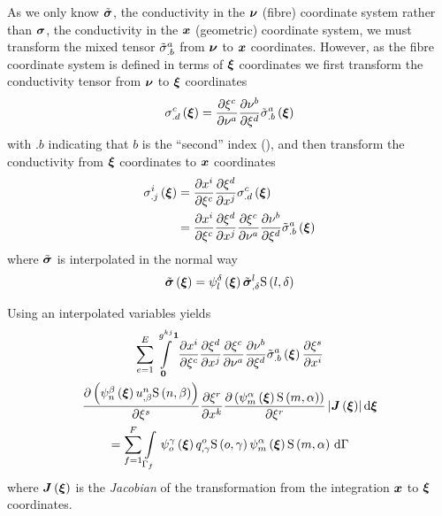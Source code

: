As we only know $\tilde{ \boldsymbol{\mathit{ \sigma }} }$, the conductivity in the 
$ \boldsymbol{\nu} $ (fibre) coordinate system rather than $ \boldsymbol{\mathit{ \sigma }} $, the
conductivity in the $ \boldsymbol{x} $ (geometric) coordinate system, we must transform the mixed
tensor ${\tilde{ \sigma }}^{a}_{.b}$ from $ \boldsymbol{\nu} $ to $ \boldsymbol{x} $ coordinates. However, as the
fibre coordinate system is defined in terms of $ \boldsymbol{\xi} $ coordinates we
first transform the conductivity tensor from $ \boldsymbol{\nu} $ to $ \boldsymbol{\xi} $
coordinates \ie
\begin{equation}
    \sigma ^{c}_{.d}\left(  \boldsymbol{\xi}  \right) = \dfrac{\partial \xi^{c}}{\partial \nu^{a}}  \dfrac{\partial \nu^{b}}{\partial \xi^{d}} 
   {\tilde{ \sigma }}^{a}_{.b}\left(  \boldsymbol{\xi}  \right) 
\end{equation}
with $.b$ indicating that $b$ is the ``second'' index (),
and then transform the conductivity from $ \boldsymbol{\xi} $ coordinates to
$ \boldsymbol{x} $ coordinates \ie
\begin{equation}
  \begin{split}
      \sigma ^{i}_{.j}\left(  \boldsymbol{\xi}  \right)  &=
     \dfrac{\partial x^{i}}{\partial \xi^{c}}  \dfrac{\partial \xi^{d}}{\partial x^{j}} 
     { \sigma }^{c}_{.d}\left(  \boldsymbol{\xi}  \right)  \\
    &=  \dfrac{\partial x^{i}}{\partial \xi^{c}}  \dfrac{\partial \xi^{d}}{\partial x^{j}}  \dfrac{\partial \xi^{c}}{\partial \nu^{a}}  \dfrac{\partial \nu^{b}}{\partial \xi^{d}}  {\tilde{ \sigma }}^{a}_{.b}\left(  \boldsymbol{\xi}  \right) 
  \end{split}
\end{equation}
where $\tilde{ \boldsymbol{\mathit{ \sigma }} }$ is interpolated in the normal way \ie
\begin{equation}
   \tilde{ \boldsymbol{\mathit{ \sigma }} }\left(  \boldsymbol{\xi}  \right) 
  =   \psi_{l}^{\delta} \left(  \boldsymbol{\xi}  \right)    {\tilde{ \boldsymbol{\mathit{ \sigma }} }}^{l} _{,\delta} 
     \mathrm{S} \left( l,\delta \right)  
\end{equation}

Using an interpolated variables yields
\begin{multline}
  \dsum_{e=1}^{E}\dintl{\vectr{0}}{\generalmetrictensorsymbol^{kj}\vectr{1}}\delby{x^{i}}{\xi^{c}}
    \delby{\xi^{d}}{x^{j}}\delby{\xi^{c}}{\nu^{a}}
    \delby{\nu^{b}}{\xi^{d}}\fnof{{\tilde{\conductivitytensorsymbol}}^{a}_{.b}}{\vectr{\xi}}\delby{\xi^{s}}{x^{i}} \\
    \delby{\pbrac{\gbfn{n}{\beta}{\vectr{\xi}}\nodedof{u}{n}{\beta}\gsf{n}{\beta}}}{\xi^{s}}
    \delby{\xi^{r}}{x^{k}}\delby{\pbrac{\gbfn{m}{\alpha}{\vectr{\xi}}\gsf{m}{\alpha}}}{\xi^{r}}
    \abs{\fnof{\matr{J}}{\vectr{\xi}}}\exteriorderiv{\vectr{\xi}} \\ 
  = \dsum_{f=1}^{F}\gint{\Gamma_{f}}{}{\gbfn{o}{\gamma}{\vectr{\xi}}\nodedof{q}{o}{\gamma}
    \gsf{o}{\gamma}\gbfn{m}{\alpha}{\vectr{\xi}}\gsf{m}{\alpha}}{\Gamma}
\end{multline}
where $\fnof{\matr{J}}{\vectr{\xi}}$ is the \emph{Jacobian} of the
transformation from the integration $ \boldsymbol{x} $ to $ \boldsymbol{\xi} $ coordinates.


